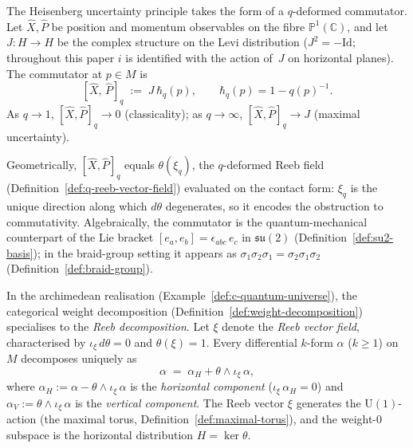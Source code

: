 \begin{remark}
\label{rem:heisenberg-commutator}
\label{rem:commutator-lie-analogy}
\label{rem:commutator-reeb-vector}
The Heisenberg uncertainty principle takes the form of a $q$-deformed
commutator.  Let $\hat{X}, \hat{P}$ be position and momentum observables
on the fibre $\mathbb{P}^1(\mathbb{C})$, and let $J \colon H \to H$ be the complex
structure on the Levi distribution ($J^2 = -\mathrm{Id}$; throughout this
paper $i$ is identified with the action of~$J$ on horizontal planes).
The commutator at $p \in M$ is
\[
  [\hat{X},\, \hat{P}]_q \;:=\; J\,\hbar_q(p),
  \qquad \hbar_q(p) = 1 - q(p)^{-1}.
\]
As $q \to 1$, $[\hat{X}, \hat{P}]_q \to 0$ (classicality); as
$q \to \infty$, $[\hat{X}, \hat{P}]_q \to J$ (maximal uncertainty).

Geometrically, $[\hat{X}, \hat{P}]_q$ equals $\theta(\xi_q)$, the
$q$-deformed Reeb field (Definition~\ref{def:q-reeb-vector-field})
evaluated on the contact form: $\xi_q$ is the unique direction along
which $d\theta$ degenerates, so it encodes the obstruction to
commutativity.  Algebraically, the commutator is the quantum-mechanical
counterpart of the Lie bracket $[e_a, e_b] = \epsilon_{abc}\,e_c$ in
$\mathfrak{su}(2)$ (Definition~\ref{def:su2-basis}); in the braid-group
setting it appears as $\sigma_1\sigma_2\sigma_1 = \sigma_2\sigma_1\sigma_2$
(Definition~\ref{def:braid-group}).
\end{remark}


\begin{example}
\label{def:reeb-decomposition}
\leanok
In the archimedean realisation
(Example~\ref{def:c-quantum-universe}), the categorical weight
decomposition (Definition~\ref{def:weight-decomposition}) specialises
to the \emph{Reeb decomposition}.  Let $\xi$ denote the \emph{Reeb
vector field}, characterised by $\iota_\xi\,d\theta = 0$ and
$\theta(\xi) = 1$.  Every differential $k$-form $\alpha$ ($k \geq 1$)
on $M$ decomposes uniquely as
\[
  \alpha \;=\; \alpha_H + \theta \wedge \iota_\xi\,\alpha,
\]
where $\alpha_H := \alpha - \theta \wedge \iota_\xi\,\alpha$ is the
\emph{horizontal component} ($\iota_\xi\,\alpha_H = 0$) and
$\alpha_V := \theta \wedge \iota_\xi\,\alpha$ is the \emph{vertical
component}.  The Reeb vector $\xi$ generates the
$\mathrm{U}(1)$-action (the maximal torus,
Definition~\ref{def:maximal-torus}), and the weight-$0$ subspace is the
horizontal distribution $H = \ker\theta$.
\end{example}

